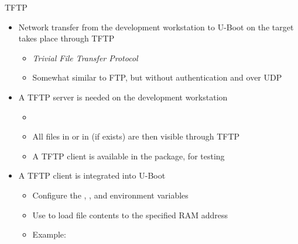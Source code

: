 \begin{frame}{TFTP}
  \begin{itemize}
  \item Network transfer from the development workstation to U-Boot
    on the target takes place through TFTP
    \begin{itemize}
    \item {\em Trivial File Transfer Protocol}
    \item Somewhat similar to FTP, but without authentication and over
      UDP
    \end{itemize}
  \item A TFTP server is needed on the development workstation
    \begin{itemize}
    \item {}
    \item All files in  or in 
      (if  exists) are then visible through TFTP
    \item A TFTP client is available in the  package,
      for testing
    \end{itemize}
  \item A TFTP client is integrated into U-Boot
    \begin{itemize}
    \item Configure the , , and
       environment variables
    \item Use  to load file contents to
      the specified RAM address
    \item Example: 
    \end{itemize}
  \end{itemize}
\end{frame}

